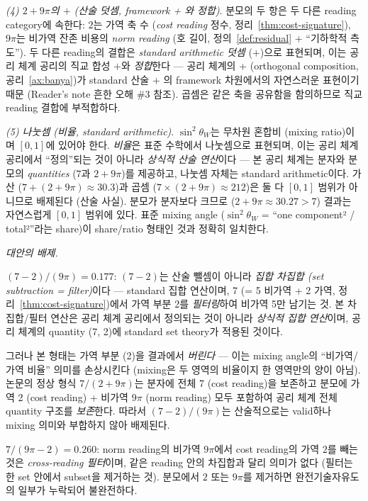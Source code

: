 \documentclass[entropy,article,submit,pdftex,oneauthor]{Definitions/mdpi}
\begin{document}
\emph{(4) $2 + 9\pi$의 $+$ (산술 덧셈, framework + 와 정합)}. 분모의 두 항은 두 다른 reading category에 속한다: $2$는 가역 축 수 (\emph{cost reading} 정수, 정리~\ref{thm:cost-signature}), $9\pi$는 비가역 잔존 비용의 \emph{norm reading} (호 길이, 정의~\ref{def:residual} + ``기하학적 측도''). 두 다른 reading의 결합은 \emph{standard arithmetic 덧셈} ($+$)으로 표현되며, 이는 공리 체계 공리의 직교 합성 $+$와 \emph{정합}한다 — 공리 체계의 + (orthogonal composition, 공리~\ref{ax:banya})가 standard 산술 + 의 framework 차원에서의 자연스러운 표현이기 때문 (Reader's note 흔한 오해 \#3 참조). 곱셈은 같은 축을 공유함을 함의하므로 직교 reading 결합에 부적합하다.

\emph{(5) 나눗셈 (비율, standard arithmetic)}. $\sin^2\theta_W$는 무차원 혼합비 (mixing ratio)이며 $[0, 1]$에 있어야 한다. \emph{비율}은 표준 수학에서 나눗셈으로 표현되며, 이는 공리 체계 공리에서 ``정의''되는 것이 아니라 \emph{상식적 산술 연산}이다 — 본 공리 체계는 분자와 분모의 \emph{quantities} ($7$과 $2 + 9\pi$)를 제공하고, 나눗셈 자체는 standard arithmetic이다. 가산 ($7 + (2+9\pi) \approx 30.3$)과 곱셈 ($7 \times (2+9\pi) \approx 212$)은 둘 다 $[0,1]$ 범위가 아니므로 배제된다 (산술 사실). 분모가 분자보다 크므로 ($2 + 9\pi \approx 30.27 > 7$) 결과는 자연스럽게 $[0,1]$ 범위에 있다. 표준 mixing angle ($\sin^2\theta_W$ = ``one component² / total²''라는 share)이 share/ratio 형태인 것과 정확히 일치한다.

\emph{대안의 배제.}

$(7-2)/(9\pi) = 0.177$: $(7-2)$는 산술 뺄셈이 아니라 \emph{집합 차집합 (set subtraction = filter)}이다 — standard 집합 연산이며, 7 (= 5 비가역 + 2 가역, 정리~\ref{thm:cost-signature})에서 가역 부분 2를 \emph{필터링}하여 비가역 5만 남기는 것. 본 차집합/필터 연산은 공리 체계 공리에서 정의되는 것이 아니라 \emph{상식적 집합 연산}이며, 공리 체계의 quantity (7, 2)에 standard set theory가 적용된 것이다.

그러나 본 형태는 가역 부분 (2)을 결과에서 \emph{버린다} — 이는 mixing angle의 ``비가역/가역 비율'' 의미를 손상시킨다 (mixing은 두 영역의 비율이지 한 영역만의 양이 아님). 논문의 정상 형식 $7/(2+9\pi)$는 분자에 전체 7 (cost reading)을 보존하고 분모에 가역 2 (cost reading) + 비가역 $9\pi$ (norm reading) 모두 포함하여 공리 체계 전체 quantity 구조를 \emph{보존}한다. 따라서 $(7-2)/(9\pi)$는 산술적으로는 valid하나 mixing 의미와 부합하지 않아 배제된다.

$7/(9\pi - 2) = 0.260$: norm reading의 비가역 $9\pi$에서 cost reading의 가역 $2$를 빼는 것은 \emph{cross-reading 필터}이며, 같은 reading 안의 차집합과 달리 의미가 없다 (필터는 한 set 안에서 subset을 제거하는 것). 분모에서 $2$ 또는 $9\pi$를 제거하면 완전기술자유도의 일부가 누락되어 불완전하다.
\end{document}
